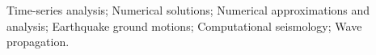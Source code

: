 Time-series analysis; Numerical solutions; Numerical approximations and analysis; Earthquake ground motions; Computational seismology; Wave propagation.